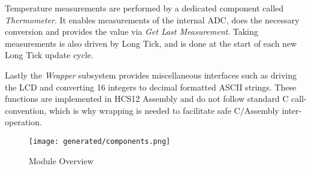 Temperature measurements are performed by a dedicated component called \emph{Thermometer}. It enables measurements of the internal ADC, does the necessary conversion and provides the value via \emph{Get Last Measurement}. Taking measurements is also driven by Long Tick, and is done at the start of each new Long Tick update cycle.

Lastly the \emph{Wrapper} subsystem provides miscellaneous interfaces such as driving the LCD and converting \SI{16}{\bit} integers to decimal formatted ASCII strings. These functions are implemented in HCS12 Assembly and do not follow standard C call-convention, which is why wrapping is needed to facilitate safe C/Assembly inter-operation.

\begin{figure}[ht]
    \centering
    \texttt{[image: generated/components.png]}
    \caption{Module Overview}\label{fig:module_overview}
\end{figure}
